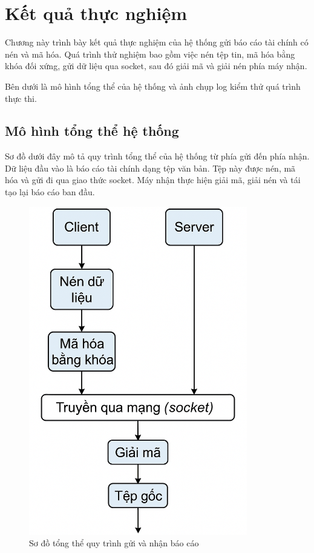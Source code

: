 \chapter{Kết quả thực nghiệm}
Chương này trình bày kết quả thực nghiệm của hệ thống gửi báo cáo tài chính có nén và mã hóa. Quá trình thử nghiệm bao gồm việc nén tệp tin, mã hóa bằng khóa đối xứng, gửi dữ liệu qua socket, sau đó giải mã và giải nén phía máy nhận.

Bên dưới là mô hình tổng thể của hệ thống và ảnh chụp log kiểm thử quá trình thực thi.
\section{Mô hình tổng thể hệ thống}

Sơ đồ dưới đây mô tả quy trình tổng thể của hệ thống từ phía gửi đến phía nhận. Dữ liệu đầu vào là báo cáo tài chính dạng tệp văn bản. Tệp này được nén, mã hóa và gửi đi qua giao thức socket. Máy nhận thực hiện giải mã, giải nén và tái tạo lại báo cáo ban đầu.

\begin{figure}[H]
    \centering
    \includegraphics[width=0.85\textwidth]{figs/architecture.png}
    \caption{Sơ đồ tổng thể quy trình gửi và nhận báo cáo}
\end{figure}

